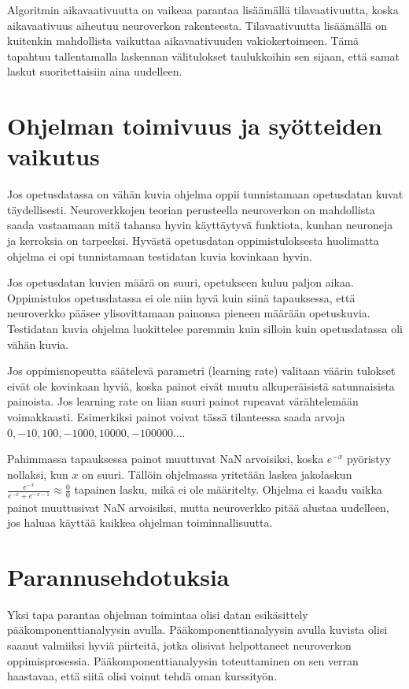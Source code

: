 \documentclass[11pt]{article}
\begin{document}
Algoritmin aikavaativuutta on vaikeaa parantaa lisäämällä tilavaativuutta, koska aikavaativuus aiheutuu neuroverkon rakenteesta. Tilavaativuutta lisäämällä on kuitenkin mahdollista vaikuttaa aikavaativuuden vakiokertoimeen. Tämä tapahtuu tallentamalla laskennan välitulokset taulukkoihin sen sijaan, että samat laskut suoritettaisiin aina uudelleen. 


\section{Ohjelman toimivuus ja syötteiden vaikutus}
Jos opetusdatassa on vähän kuvia ohjelma oppii tunnistamaan opetusdatan kuvat täydellisesti. Neuroverkkojen teorian perusteella neuroverkon on mahdollista saada vastaamaan mitä tahansa hyvin käyttäytyvä funktiota, kunhan neuroneja ja kerroksia on tarpeeksi. Hyvästä opetusdatan oppimistuloksesta huolimatta ohjelma ei opi tunnistamaan testidatan kuvia kovinkaan hyvin.

Jos opetusdatan kuvien määrä on suuri, opetukseen kuluu paljon aikaa. Oppimistulos opetusdatassa ei ole niin hyvä kuin siinä tapauksessa, että neuroverkko pääsee ylisovittamaan painonsa pieneen määrään opetuskuvia. Testidatan kuvia ohjelma luokittelee paremmin kuin silloin kuin opetusdatassa oli vähän kuvia.

Jos oppimisnopeutta säätelevä parametri (learning rate) valitaan väärin tulokset eivät ole kovinkaan hyviä, koska painot eivät muutu alkuperäisistä satunnaisista painoista. Jos learning rate on liian suuri painot rupeavat värähtelemään voimakkaasti. Esimerkiksi painot voivat tässä tilanteessa saada arvoja $0, -10, 100, -1000, 10000, -100000 \hdots$.

Pahimmassa tapauksessa painot muuttuvat NaN arvoisiksi, koska $e^{-x}$ pyöristyy nollaksi, kun $x$ on suuri. Tällöin ohjelmassa yritetään laskea jakolaskun $\frac{e^{-x}}{e^{-x} + e^{-x - 1}}\approx \frac{0}{0}$ tapainen lasku, mikä ei ole määritelty. Ohjelma ei kaadu vaikka painot muuttusivat NaN arvoisiksi, mutta neuroverkko pitää alustaa uudelleen, jos haluaa käyttää kaikkea ohjelman toiminnallisuutta.

\section{Parannusehdotuksia}


Yksi tapa parantaa ohjelman toimintaa olisi datan esikäsittely pääkomponenttianalyysin avulla. Pääkomponenttianalyysin avulla kuvista olisi saanut valmiiksi hyviä piirteitä, jotka olisivat helpottaneet neuroverkon oppimisprosessia. Pääkomponenttianalyysin toteuttaminen on sen verran haastavaa, että siitä olisi voinut tehdä oman kurssityön.
\end{document}
